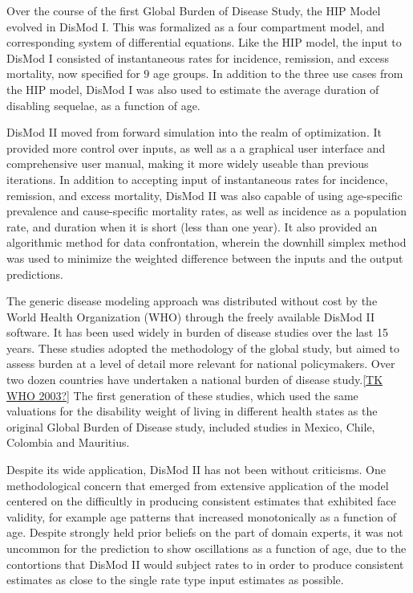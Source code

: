 Over the course of the first Global Burden of Disease Study, the HIP
Model evolved in DisMod I.\cite{Harvard_Global_1996} This was
formalized as a four compartment model, and corresponding system of
differential equations.  Like the HIP model, the input to DisMod I
consisted of instantaneous rates for incidence, remission, and excess
mortality, now specified for $9$ age groups.  In addition to the three
use cases from the HIP model, DisMod I was also used to estimate the
average duration of disabling sequelae, as a function of age.

DisMod II moved from forward simulation into the realm of
optimization.  It provided more control over inputs, as well as a a
graphical user interface and comprehensive user manual, making it more
widely useable than previous iterations.\cite{Barendregt_Generic_2003}
In addition to accepting input of instantaneous rates for incidence,
remission, and excess mortality, DisMod II was also capable of using
age-specific prevalence and cause-specific mortality rates, as well as
incidence as a population rate, and duration when it is short (less
than one year).  It also provided an algorithmic method for data
confrontation, wherein the downhill simplex method was used to
minimize the weighted difference between the inputs and the output
predictions.

The generic disease modeling approach was distributed without cost by
the World Health Organization (WHO) through the freely available
DisMod II software. It has been used widely in burden of disease
studies over the last 15 years. These studies adopted the methodology
of the global study, but aimed to assess burden at a level of detail
more relevant for national policymakers. Over two dozen countries have
undertaken a national burden of disease study.\ref{TK WHO 2003?} The
first generation of these studies, which used the same valuations for
the disability weight of living in different health states as the
original Global Burden of Disease study, included studies in Mexico,
Chile, Colombia and
Mauritius.\cite{Lozano_Burden_1995,Concha_Carga_1996,Republica_Carga_1994,Vos_Mauritius_1996}

Despite its wide application, DisMod II has not been without
criticisms.  One methodological concern that emerged from extensive
application of the model centered on the difficultly in producing
consistent estimates that exhibited face validity, for example age
patterns that increased monotonically as a function of age. Despite
strongly held prior beliefs on the part of domain experts, it was not
uncommon for the prediction to show oscillations as a function of age, due
to the contortions that DisMod II would subject rates to in order to
produce consistent estimates as close to the single rate type input
estimates as possible.

